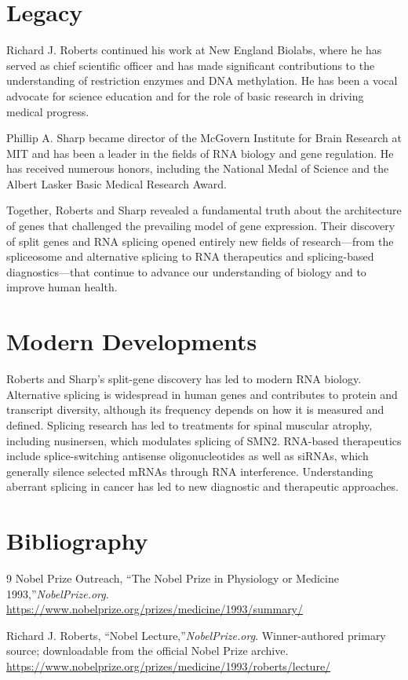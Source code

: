 \section{Legacy}

Richard J. Roberts continued his work at New England Biolabs, where he has served as chief scientific officer and has made significant contributions to the understanding of restriction enzymes and DNA methylation. He has been a vocal advocate for science education and for the role of basic research in driving medical progress.

Phillip A. Sharp became director of the McGovern Institute for Brain Research at MIT and has been a leader in the fields of RNA biology and gene regulation. He has received numerous honors, including the National Medal of Science and the Albert Lasker Basic Medical Research Award.

Together, Roberts and Sharp revealed a fundamental truth about the architecture of genes that challenged the prevailing model of gene expression. Their discovery of split genes and RNA splicing opened entirely new fields of research---from the spliceosome and alternative splicing to RNA therapeutics and splicing-based diagnostics---that continue to advance our understanding of biology and to improve human health.


\section{Modern Developments}

Roberts and Sharp's split-gene discovery has led to modern RNA biology. Alternative splicing is widespread in human genes and contributes to protein and transcript diversity, although its frequency depends on how it is measured and defined. Splicing research has led to treatments for spinal muscular atrophy, including nusinersen, which modulates splicing of SMN2. RNA-based therapeutics include splice-switching antisense oligonucleotides as well as siRNAs, which generally silence selected mRNAs through RNA interference. Understanding aberrant splicing in cancer has led to new diagnostic and therapeutic approaches.


\section{Bibliography}

\begin{thebibliography}{9}
Nobel Prize Outreach, ``The Nobel Prize in Physiology or Medicine 1993,''\emph{NobelPrize.org}.\\
\url{https://www.nobelprize.org/prizes/medicine/1993/summary/}

Richard J. Roberts, ``Nobel Lecture,''\emph{NobelPrize.org}. Winner-authored primary source; downloadable from the official Nobel Prize archive.\\
\url{https://www.nobelprize.org/prizes/medicine/1993/roberts/lecture/}
\end{thebibliography}

